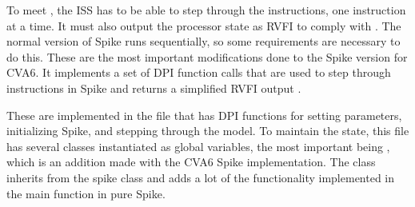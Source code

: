 To meet , the ISS has to be able to step through the instructions, one instruction at a time. It must also output the processor state as RVFI to comply with . The normal version of Spike runs sequentially, so some requirements are necessary to do this. These are the most important modifications done to the Spike version for CVA6. It implements a set of DPI function calls that are used to step through instructions in Spike and returns a simplified RVFI output \cite{openhwgroupOpenhwgroupCorevverif2023}.

These are implemented in the  file that has DPI functions for setting parameters, initializing Spike, and stepping through the model. To maintain the state, this file has several classes instantiated as global variables, the most important being , which is an addition made with the CVA6 Spike implementation. The  class inherits from the spike  class and adds a lot of the functionality implemented in the main function in pure Spike.  



